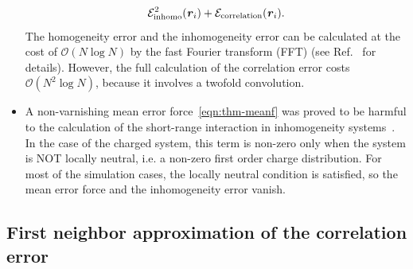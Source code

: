 \documentclass[aps,pre,preprint]{revtex4}
\renewcommand{\v}[1]{\textbf{\textit{#1}}}
\begin{document}
\begin{itemize}
\begin{align}
    \mathcal E^2_{\textrm{inhomo}}(\v r_i) +
    \mathcal E_{\textrm{correlation}}(\v r_i).
  \end{align}
  The homogeneity error and the inhomogeneity
  error can be calculated at the cost of $\mathcal O(N\log N)$ by the
  fast Fourier transform (FFT) (see Ref.~\cite{wang2012} for details).
  However, the full calculation of the correlation error costs $\mathcal
  O(N^2\log N)$, because it involves a twofold convolution.
\item A non-varnishing mean error force~\eqref{eqn:thm-meanf} was proved
  to be
  harmful to the calculation of the short-range interaction
  in inhomogeneity systems~\cite{wang2012}.
  In the case of the charged system, this
  term is non-zero only when the system is NOT locally neutral,
  i.e. a non-zero first order charge distribution. For
  most of the simulation cases, the locally neutral condition is
  satisfied, so the mean error force and the inhomogeneity error
  vanish.
\end{itemize}

\subsection{First neighbor approximation of the correlation
error}
\end{document}
